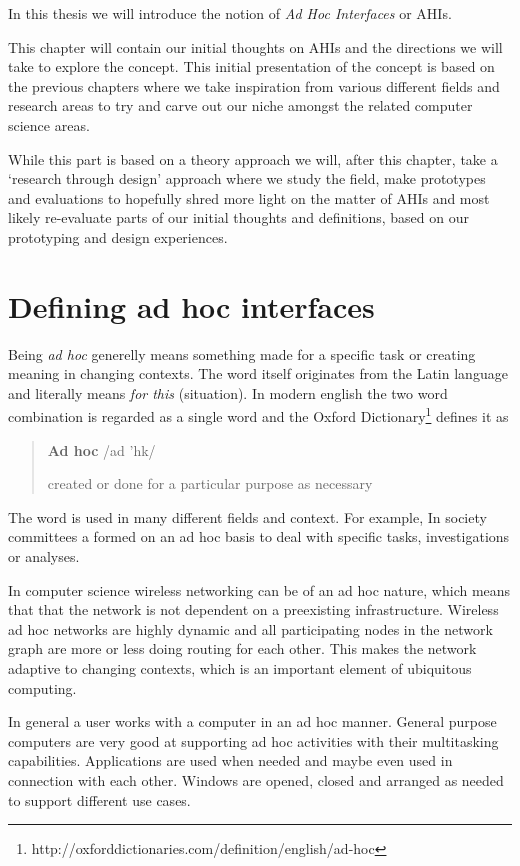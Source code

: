 
In this thesis we will introduce the notion of \emph{Ad Hoc Interfaces} or AHIs.

This chapter will contain our initial thoughts on AHIs and the directions we will take to explore the concept.
This initial presentation of the concept is based on the previous chapters where we take inspiration from various different fields and research areas to try and carve out our niche amongst the related computer science areas.

While this part is based on a theory approach we will, after this chapter, take a `research through design' approach where we study the field, make prototypes and evaluations to hopefully shred more light on the matter of AHIs and most likely re-evaluate parts of our initial thoughts and definitions, based on our prototyping and design experiences. 

\section{Defining ad hoc interfaces}
Being \emph{ad hoc} generelly means something made for a specific task or creating meaning in changing contexts.
The word itself originates from the Latin language and literally means \emph{for this} (situation). 
In modern english the two word combination is regarded as a single word and the Oxford Dictionary\footnote{http://oxforddictionaries.com/definition/english/ad-hoc} defines it as

\begin{quotation}
\textbf{Ad hoc}  /ad 'h\textturnscripta k/

created or done for a particular purpose as necessary
\end{quotation}

The word is used in many different fields and context.
For example, In society committees a formed on an ad hoc basis to deal with specific tasks, investigations or analyses.

In computer science wireless networking can be of an ad hoc nature, which means that that the network is not dependent on a preexisting infrastructure.
Wireless ad hoc networks are highly dynamic and all participating nodes in the network graph are more or less doing routing for each other.
This makes the network adaptive to changing contexts, which is an important element of ubiquitous computing.

In general a user works with a computer in an ad hoc manner.
General purpose computers are very good at supporting ad hoc activities with their multitasking capabilities.
Applications are used when needed and maybe even used in connection with each other.
Windows are opened, closed and arranged as needed to support different use cases.

